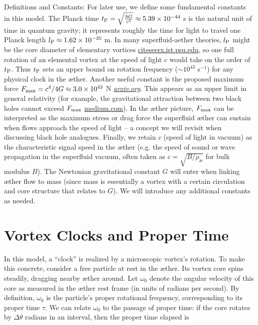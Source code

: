 \documentclass[aps,preprint,superscriptaddress]{revtex4}
\begin{document}
    Definitions and Constants: For later use, we define some fundamental constants in this model. The Planck time $t_{\rm P} = \sqrt{\frac{\hbar G}{c^5}} \approx 5.39\times10^{-44}$ s is the natural unit of time in quantum gravity; it represents roughly the time for light to travel one Planck length $l_{\rm P}\approx1.62\times10^{-35}$ m. In many superfluid-aether theories, $l_{\rm P}$ might be the core diameter of elementary vortices
    \href{https://citeseerx.ist.psu.edu/document?repid=rep1&type=pdf&doi=25483f1ebc9dc442a9f1505a49d96eb35e92e3f4#:~:text=45,on%20General%20Relativity%20and%20Relativistic}{citeseerx.ist.psu.edu}, so one full rotation of an elemental vortex at the speed of light $c$ would take on the order of $t_{\rm P}$. Thus $t_{\rm P}$ sets an upper bound on rotation frequency ($\sim10^{43}$ s$^{-1}$) for any physical clock in the æther. Another useful constant is the proposed maximum force $F_{\rm max}=c^4/4G \approx 3.0\times10^{43}$ N
    \href{https://arxiv.org/abs/2205.06302#:~:text=the%20principle%20of%20maximum%20force,The%20limits%20illuminate}{\textit{arxiv.org}}. This appears as an upper limit in general relativity (for example, the gravitational attraction between two black holes cannot exceed $F_{\rm max}$
    \href{https://medium.com/@motionmountain/4-there-is-a-maximum-force-in-nature-d87e1951e9a4#:~:text=,implies%20inverse%20square%20gravity}{medium.com}). In the æther picture, $F_{\rm max}$ can be interpreted as the maximum stress or drag force the superfluid æther can sustain when flows approach the speed of light – a concept we will revisit when discussing black hole analogues. Finally, we retain $c$ (speed of light in vacuum) as the characteristic signal speed in the æther (e.g. the speed of sound or wave propagation in the superfluid vacuum, often taken as $c=\sqrt{B/\rho_{\text{\ae}}}$ for bulk modulus $B$). The Newtonian gravitational constant $G$ will enter when linking æther flow to mass (since mass is essentially a vortex with a certain circulation and core structure that relates to $G$). We will introduce any additional constants as needed.


\section*{Vortex Clocks and Proper Time}

In this model, a “clock” is realized by a microscopic vortex’s rotation. To make this concrete, consider a free particle at rest in the æther. Its vortex core spins steadily, dragging nearby æther around. Let $\omega_0$ denote the angular velocity of this core as measured in the æther rest frame (in units of radians per second). By definition, $\omega_0$ is the particle’s proper rotational frequency, corresponding to its proper time $\tau$. We can relate $\omega_0$ to the passage of proper time: if the core rotates by $\Delta \theta$ radians in an interval, then the proper time elapsed is
\end{document}
